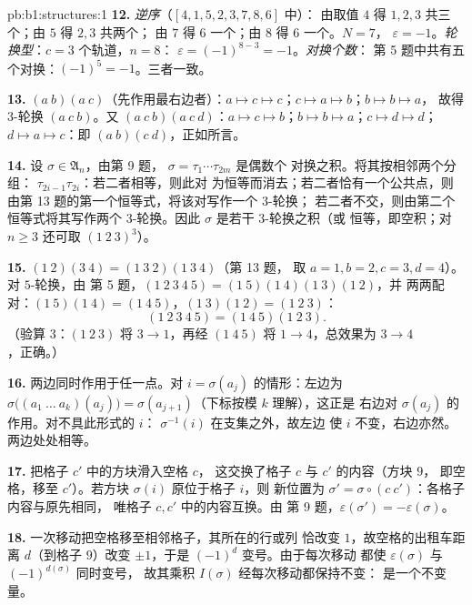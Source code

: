 \begin{solution}{pb:b1:structures:1}
\textbf{12.} \emph{逆序}（$[4, 1, 5, 2, 3, 7, 8, 6]$ 中）：
由取值 $4$ 得 $1, 2, 3$ 共三个；由 $5$ 得 $2, 3$ 共两个；
由 $7$ 得 $6$ 一个；由 $8$ 得 $6$ 一个。$N = 7$，
$\varepsilon = -1$。\emph{轮换型}：$c = 3$ 个轨道，$n = 8$：
$\varepsilon = (-1)^{8-3} = -1$。\emph{对换个数}：
第 5 题中共有五个对换：$(-1)^5 = -1$。三者一致。

\textbf{13.} $(a\ b)(a\ c)$（先作用最右边者）：$a \mapsto c
\mapsto c$；$c \mapsto a \mapsto b$；$b \mapsto b \mapsto a$，
故得 $3$-轮换 $(a\ c\ b)$。又 $(a\ c\ b)(a\ c\ d)$：$a \mapsto c
\mapsto b$；$b \mapsto b \mapsto a$；$c \mapsto d \mapsto d$；$d
\mapsto a \mapsto c$：即 $(a\ b)(c\ d)$，正如所言。

\textbf{14.} 设 $\sigma \in \mathfrak A_n$，由第 9 题，
$\sigma = \tau_1\cdots\tau_{2m}$ 是偶数个
对换之积。将其按相邻两个分组：
$\tau_{2i-1}\tau_{2i}$：若二者相等，则此对
为恒等而消去；若二者恰有一个公共点，则
由第 13 题的第一个恒等式，将该对写作一个 $3$-轮换；
若二者不交，则由第二个恒等式将其写作两个
$3$-轮换。因此 $\sigma$ 是若干 $3$-轮换之积（或
恒等，即空积；对 $n \geq 3$ 还可取 $(1\ 2\
3)^3$）。

\textbf{15.} $(1\ 2)(3\ 4) = (1\ 3\ 2)(1\ 3\ 4)$（第 13 题，
取 $a{=}1, b{=}2, c{=}3, d{=}4$）。对 $5$-轮换，由
第 5 题，$(1\ 2\ 3\ 4\ 5) = (1\ 5)(1\ 4)(1\ 3)(1\ 2)$，并
两两配对：$(1\ 5)(1\ 4) = (1\ 4\ 5)$，$(1\ 3)(1\ 2) = (1\ 2\ 3)$：
\[
(1\ 2\ 3\ 4\ 5) = (1\ 4\ 5)(1\ 2\ 3) .
\]
（验算 $3$：$(1\ 2\ 3)$
将 $3 \to 1$，再经 $(1\ 4\ 5)$ 将 $1 \to 4$，总效果为 $3 \to 4$，正确。）

\textbf{16.} 两边同时作用于任一点。对 $i =
\sigma(a_j)$ 的情形：左边为 $\sigma\bigl((a_1\ \dots\
a_k)(a_j)\bigr) = \sigma(a_{j+1})$（下标按模 $k$ 理解），这正是
右边对 $\sigma(a_j)$ 的作用。对不具此形式的 $i$：
$\sigma^{-1}(i)$ 在支集之外，故左边
使 $i$ 不变，右边亦然。两边处处相等。

\textbf{17.} 把格子 $c'$ 中的方块滑入空格 $c$，
这交换了格子 $c$ 与 $c'$ 的内容（方块 $9$，
即空格，移至 $c'$）。若方块 $\sigma(i)$ 原位于格子 $i$，则
新位置为 $\sigma' = \sigma \circ (c\ c')$：各格子内容与原先相同，
唯格子 $c, c'$ 中的内容互换。由
第 9 题，$\varepsilon(\sigma') = -\varepsilon(\sigma)$。

\textbf{18.} 一次移动把空格移至相邻格子，其所在的行或列
恰改变 $1$，故空格的出租车距离
$d$（到格子 $9$）改变 $\pm1$，于是 $(-1)^d$ 变号。由于每次移动
都使 $\varepsilon(\sigma)$ 与 $(-1)^{d(\sigma)}$ 同时变号，
故其乘积 $I(\sigma)$ 经每次移动都保持不变：
是一个不变量。


\end{solution}
